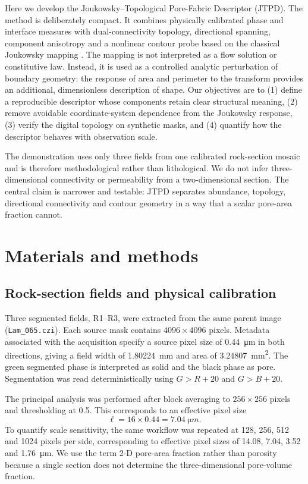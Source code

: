 \documentclass[preprint,12pt,authoryear]{elsarticle}
\begin{document}
Here we develop the Joukowsky--Topological Pore-Fabric Descriptor (JTPD). The method is deliberately compact. It combines physically calibrated phase and interface measures with dual-connectivity topology, directional spanning, component anisotropy and a nonlinear contour probe based on the classical Joukowsky mapping \citep{Repp1974}. The mapping is not interpreted as a flow solution or constitutive law. Instead, it is used as a controlled analytic perturbation of boundary geometry: the response of area and perimeter to the transform provides an additional, dimensionless description of shape. Our objectives are to (1) define a reproducible descriptor whose components retain clear structural meaning, (2) remove avoidable coordinate-system dependence from the Joukowsky response, (3) verify the digital topology on synthetic masks, and (4) quantify how the descriptor behaves with observation scale.

The demonstration uses only three fields from one calibrated rock-section mosaic and is therefore methodological rather than lithological. We do not infer three-dimensional connectivity or permeability from a two-dimensional section. The central claim is narrower and testable: JTPD separates abundance, topology, directional connectivity and contour geometry in a way that a scalar pore-area fraction cannot.

\section{Materials and methods}

\subsection{Rock-section fields and physical calibration}

Three segmented fields, R1--R3, were extracted from the same parent image (\texttt{Lam\_065.czi}). Each source mask contains $4096\times4096$ pixels. Metadata associated with the acquisition specify a source pixel size of \SI{0.44}{\micro m} in both directions, giving a field width of \SI{1.80224}{mm} and area of \SI{3.24807}{mm^2}. The green segmented phase is interpreted as solid and the black phase as pore. Segmentation was read deterministically using $G>R+20$ and $G>B+20$.

The principal analysis was performed after block averaging to $256\times256$ pixels and thresholding at 0.5. This corresponds to an effective pixel size
\begin{equation}
\ell = 16\times 0.44 = \SI{7.04}{\micro m}.
\end{equation}
To quantify scale sensitivity, the same workflow was repeated at 128, 256, 512 and 1024 pixels per side, corresponding to effective pixel sizes of 14.08, 7.04, 3.52 and \SI{1.76}{\micro m}. We use the term 2-D pore-area fraction rather than porosity because a single section does not determine the three-dimensional pore-volume fraction.
\end{document}
